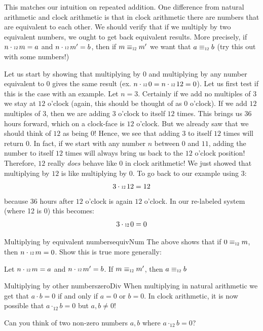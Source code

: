 \documentclass[oneside]{book}
\newcommand\scalemath[2]{\scalebox{#1}{\mbox{\ensuremath{\displaystyle #2}}}}
\newcommand{\Equiv}[1]{\equiv_{\scalemath{0.6}{#1}}}
\newcommand{\Cdot}[1]{\cdot{\scalemath{0.6}{#1}}\,}
\newcommand{\qn}{\quad\newline}
\begin{document}
This matches our intuition on repeated addition. One difference from natural arithmetic and clock arithmetic
is that in clock arithmetic there are numbers that are equivalent to each other. We should verify that if we
multiply by two equivalent numbers, we ought to get back equivalent results. More precisely, if $n\Cdot{12}m = a$ and
$n\Cdot{12}m' = b$, then if $m\Equiv{12}m'$ we want that $a\Equiv{12}b$ (try this out with some numbers!)

Let us start by showing that multiplying by $0$ and multiplying by any number equivalent to $0$ gives the same
result (ex. $n\Cdot{12} 0 = n\Cdot{12} 12 = 0$). Let us first test if this is the case with an example. Let $n
= 3$. Certainly if we add no multiples of $3$ we stay at $12$ o'clock (again, this should be thought of as $0$
o'clock). If we add $12$ multiples of $3$, then we are adding $3$ o'clock to itself $12$ times. This brings us
$36$ hours forward, which on a clock-face is $12$ o'clock. But we already saw that we should think of $12$ as
being $0$! Hence, we see that adding $3$ to itself $12$ times will return $0$. In fact, if we start with any
number $n$ between $0$ and $11$, adding the number to itself $12$ times will always bring us back to the $12$
o'clock position! Therefore, $12$ really \emph{does} behave like $0$ in clock arithmetic! We just showed that
multiplying by $12$ is like multiplying by 0. To go back to our example using $3$:
\[
  3\Cdot{12}12 = 12
\]
because $36$ hours after $12$ o'clock is again $12$ o'clock. In our re-labeled system (where 12
is 0) this becomes:
\[
  3\Cdot{12}0 = 0
\]
\begin{exercise}{Multiplying by equivalent numbers}{equivNum}
  The above shows that if $0\Equiv{12} m$, then $n\Cdot{12}m = 0$. Show this is true more generally:
  \begin{center}
      Let $n\Cdot{12}m = a$ and $n\Cdot{12}m' = b$. If $m\Equiv{12}m'$, then $a\Equiv{12}b$
  \end{center}
\end{exercise}

\begin{exercise}{Multiplying by other numbers}{zeroDiv}
  When multiplying in natural arithmetic we get that $a\cdot b= 0$ if and only if $a = 0$ or $b= 0$. In
  clock arithmetic, it is now possible that $a\cdot_{12}b=  0$ but $a,b \ne 0$!

  \qn
  Can you think of two non-zero numbers $a,b$ where $a\cdot_{12}b = 0$?
\end{exercise}
\end{document}
